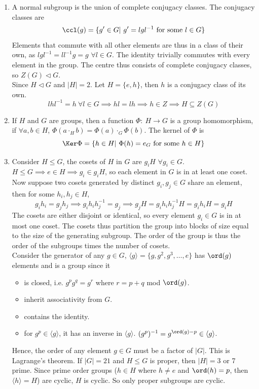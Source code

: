 \documentclass[a4paper]{article}
\begin{document}
\begin{ans}\leavevmode
\begin{enumerate}[label=(\alph*)]
\item A normal subgroup is the union of complete conjugacy classes. The conjugacy classes are
$$\ccl(g)=\{g'\in G|~g'=lgl^{-1}\text{ for some }l\in G\}$$
Elements that commute with all other elements are thus in a class of their own, as $lgl^{-1}=ll^{-1}g=g$ $\forall l\in G$. The identity trivially commutes with every element in the group. The  centre thus consists of complete conjugacy classes, so $Z(G)\lhd G$.\\[5pt]
Since $H\lhd G$ and $|H|=2$. Let $H=\{e,h\}$, then $h$ is a conjugacy class of its own. 
$$lhl^{-1}=h~\forall l\in G\implies hl=lh\implies h\in Z\implies H\subseteq Z(G)$$
\item If $H$ and $G$ are groups, then a function $\Phi:~H\rightarrow G$ is a group homomorphism, if $\forall a,b\in H$, $\Phi(a\cdot_Hb)=\Phi(a)\cdot_G\Phi(b)$. The kernel of $\Phi$ is
$$\Ker\Phi=\{h\in H|~\Phi(h)=e_G\text{ for some }h\in H\}$$
\item Consider $H\leq G$, the cosets of $H$ in $G$ are $g_iH$ $\forall g_i\in G$. $H\leq G\implies e\in H\implies g_i\in g_iH$, so each element in $G$ is in at least one coset. Now suppose two cosets generated by distinct $g_i,g_j\in G$ share an element, then for some $h_i,h_j\in H$,
$$g_ih_i=g_jh_j\implies g_ih_ih_j^{-1}=g_j\implies g_jH=g_ih_ih_j^{-1}H=g_ih_iH=g_iH$$
The cosets are either disjoint or identical, so every element $g_i\in G$ is in at most one coset. The cosets thus partition the group into blocks of size equal to the size of the generating subgroup. The order of the group is thus the order of the subgroups times the number of cosets.\\[5pt]
Consider the generator of any $g\in G$, $\langle g\rangle=\{g,g^2,g^3,\dots,e\}$ has $\ord(g)$ elements and is a group since it
\begin{itemize}
    \item is closed, i.e. $g^pg^q=g^{r}$ where $r=p+q$ mod $\ord(g)$.
    \item inherit associativity from $G$.
    \item contains the identity.
    \item for $g^p\in\langle g\rangle$, it has an inverse in $\langle g\rangle$. $(g^p)^{-1}=g^{\ord(g)-p}\in\langle g\rangle$.
\end{itemize}
Hence, the order of any element $g\in G$ must be a factor of $|G|$. This is Lagrange's theorem. If $|G|=21$ and $H\leq G$ is proper, then $|H|=3$ or 7 prime. Since prime order groups ($h\in H$ where $h\neq e$ and $\ord(h)=p$, then $\langle h\rangle=H$) are cyclic, $H$ is cyclic. So only proper subgroups are cyclic.
\end{enumerate}
\end{ans}
\end{document}
